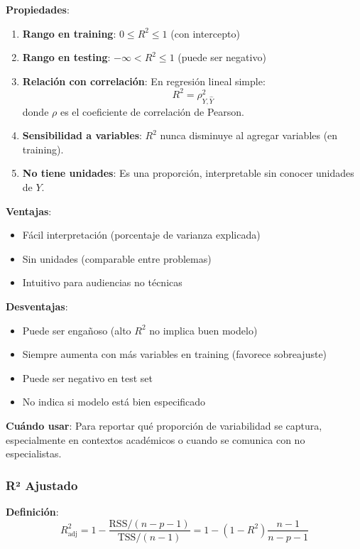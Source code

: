 \documentclass[
  doc,
  floatsintext,
  longtable,
  a4paper,
  nolmodern,
  notxfonts,
  notimes,
  12pt,
  colorlinks=true,linkcolor=blue,citecolor=blue,urlcolor=blue]{apa7}
\providecommand{\tightlist}{%
  \setlength{\itemsep}{0pt}\setlength{\parskip}{0pt}}
\begin{document}
\textbf{Propiedades}:

\begin{enumerate}
\def\labelenumi{\arabic{enumi}.}
\item
  \textbf{Rango en training}: \(0 \leq R^2 \leq 1\) (con intercepto)
\item
  \textbf{Rango en testing}: \(-\infty < R^2 \leq 1\) (puede ser
  negativo)
\item
  \textbf{Relación con correlación}: En regresión lineal simple: \[
  R^2 = \rho^2_{Y,\hat{Y}}
  \] donde \(\rho\) es el coeficiente de correlación de Pearson.
\item
  \textbf{Sensibilidad a variables}: \(R^2\) nunca disminuye al agregar
  variables (en training).
\item
  \textbf{No tiene unidades}: Es una proporción, interpretable sin
  conocer unidades de \(Y\).
\end{enumerate}

\textbf{Ventajas}:

\begin{itemize}
\tightlist
\item
  Fácil interpretación (porcentaje de varianza explicada)
\item
  Sin unidades (comparable entre problemas)
\item
  Intuitivo para audiencias no técnicas
\end{itemize}

\textbf{Desventajas}:

\begin{itemize}
\tightlist
\item
  Puede ser engañoso (alto \(R^2\) no implica buen modelo)
\item
  Siempre aumenta con más variables en training (favorece sobreajuste)
\item
  Puede ser negativo en test set
\item
  No indica si modelo está bien especificado
\end{itemize}

\textbf{Cuándo usar}: Para reportar qué proporción de variabilidad se
captura, especialmente en contextos académicos o cuando se comunica con
no especialistas.

\subsubsection{R² Ajustado}\label{ruxb2-ajustado}

\textbf{Definición}: \[
R^2_{\text{adj}} = 1 - \frac{\text{RSS}/(n-p-1)}{\text{TSS}/(n-1)} = 1 - (1-R^2)\frac{n-1}{n-p-1}
\]
\end{document}
